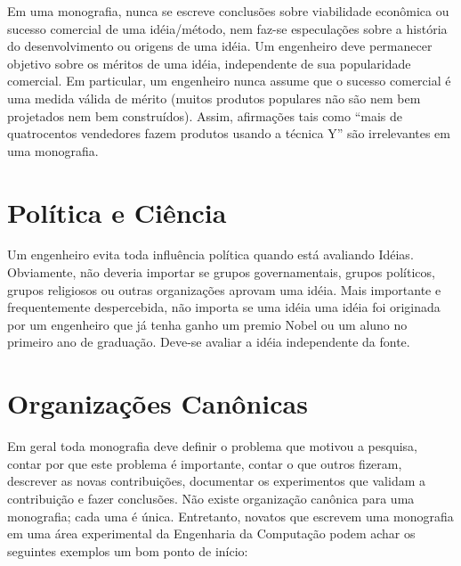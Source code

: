 Em uma monografia, nunca se escreve conclus\~{o}es sobre viabilidade econômica ou sucesso comercial de uma id\'{e}ia/m\'{e}todo, nem faz-se especula\c{c}\~{o}es sobre a hist\'{o}ria do desenvolvimento ou origens de
uma id\'{e}ia. Um engenheiro deve permanecer objetivo sobre os m\'{e}ritos de uma id\'{e}ia, independente de sua popularidade comercial. Em particular, um engenheiro nunca assume que o sucesso comercial \'{e} uma medida v\'{a}lida 
de m\'{e}rito (muitos produtos populares n\~{a}o s\~{a}o nem bem projetados nem bem constru\'{i}dos). Assim, afirma\c{c}\~{o}es tais como ``mais de quatrocentos vendedores fazem produtos usando a t\'{e}cnica Y'' s\~{a}o irrelevantes em uma monografia.

\section{Pol\'{i}tica e Ciência}

Um engenheiro evita toda influência pol\'{i}tica quando est\'{a} avaliando Id\'{e}ias. Obviamente, n\~{a}o deveria importar se grupos governamentais, grupos pol\'{i}ticos, grupos religiosos ou outras organiza\c{c}\~{o}es aprovam uma id\'{e}ia.
Mais importante e frequentemente despercebida, n\~{a}o importa se uma id\'{e}ia uma id\'{e}ia foi originada por um engenheiro que j\'{a} tenha ganho um premio Nobel ou um aluno no primeiro ano de gradua\c{c}\~{a}o. Deve-se avaliar a id\'{e}ia independente da fonte.

\section{Organiza\c{c}\~{o}es Canônicas}
 	
Em geral toda monografia deve definir o problema que motivou a pesquisa, contar por que este problema \'{e} importante, contar o que outros fizeram, descrever as novas contribui\c{c}\~{o}es, documentar os experimentos que validam a contribui\c{c}\~{a}o e fazer conclus\~{o}es.
N\~{a}o existe organiza\c{c}\~{a}o canônica para uma monografia; cada uma \'{e} \'{u}nica. Entretanto, novatos que escrevem uma monografia em uma \'{a}rea experimental da Engenharia da Computa\c{c}\~{a}o podem achar os seguintes exemplos um bom ponto de in\'{i}cio: 

